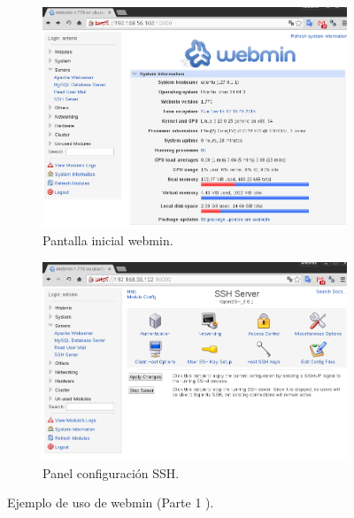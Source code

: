 \begin{figure}[H]
    \centering
    \begin{subfigure}[b]{0.7\textwidth}
        \includegraphics[width=\textwidth]{imagenes/img25}
    \caption{Pantalla inicial webmin.} 
    \label{fig22} 
    \end{subfigure}
    
        \begin{subfigure}[b]{0.7\textwidth}
        \includegraphics[width=\textwidth]{imagenes/img26}
    \caption{Panel configuración SSH.} 
    \label{fig23} 
    \end{subfigure}
        \caption{Ejemplo de uso de webmin  (Parte 1 ).}  
\end{figure}

